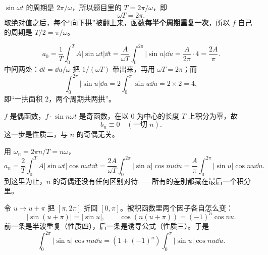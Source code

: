 \documentclass[11pt]{ctexart}
\begin{document}




$\sin\omega t$ 的周期是 $2\pi/\omega$，所以题目里的 $T=2\pi/\omega$，即
\[
\omega T=2\pi .
\]
取绝对值之后，每个“向下拱”被翻上来，函数\textbf{每半个周期重复一次}，所以 $f$ 自己的周期是 $T/2=\pi/\omega$。



\[
a_0=\frac1T\int_0^{T}A\left|\sin\omega t\right|\dd t
=\frac{A}{\omega T}\int_0^{2\pi}\left|\sin u\right|\dd u
=\frac{A}{2\pi}\cdot4=\frac{2A}{\pi}.
\]
中间两处：$\dd t=\dd u/\omega$ 把 $1/(\omega T)$ 带出来，再用 $\omega T=2\pi$；而
\[
\int_0^{2\pi}\left|\sin u\right|\dd u=2\int_0^{\pi}\sin u\dd u=2\times2=4,
\]
即“一拱面积 $2$，两个周期共两拱”。


$f$ 是偶函数，$f\cdot\sin n\omega t$ 是奇函数，在以 $0$ 为中心的长度 $T$ 上积分为零，故
\[
b_n\equiv0\quad(\text{一切 }n).
\]
这一步是性质二，与 $n$ 的奇偶无关。


用 $\omega_n=2\pi n/T=n\omega$，
\[
a_n=\frac2T\int_0^{T}A\left|\sin\omega t\right|\cos n\omega t\dd t
=\frac{2A}{\omega T}\int_0^{2\pi}\left|\sin u\right|\cos nu\dd u
=\frac{A}{\pi}\int_0^{2\pi}\left|\sin u\right|\cos nu\dd u .
\]
到这里为止，$n$ 的奇偶还没有任何区别对待——所有的差别都藏在最后一个积分里。


令 $u\to u+\pi$ 把 $\left[\pi,2\pi\right]$ 折回 $\left[0,\pi\right]$。被积函数里两个因子各自怎么变：
\[
\left|\sin(u+\pi)\right|=\left|\sin u\right|,\qquad
\cos\left(n(u+\pi)\right)=(-1)^n\cos nu .
\]
前一条是半波重复（性质四），后一条是诱导公式（性质三）。于是
\[
\int_0^{2\pi}\left|\sin u\right|\cos nu\dd u
=\left(1+(-1)^n\right)\int_0^{\pi}\left|\sin u\right|\cos nu\dd u .
\]
\end{document}
